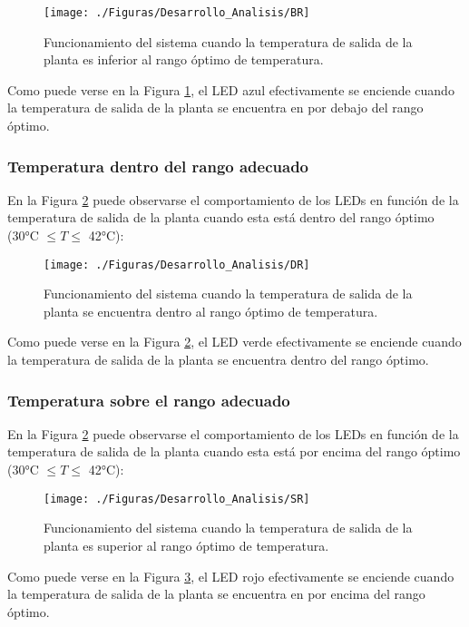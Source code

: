 \begin{figure}[H]
\centering
\texttt{[image: ./Figuras/Desarrollo\_Analisis/BR]}
\caption{Funcionamiento del sistema cuando la temperatura de salida de la planta es inferior al rango óptimo de temperatura.} 
\label{fig:BR}
\end{figure}

Como puede verse en la Figura \ref{fig:BR}, el LED azul efectivamente se enciende cuando la temperatura de salida de la planta se encuentra en por debajo del rango óptimo.

\subsubsection{Temperatura dentro del rango adecuado}
En la Figura \ref{fig:DR} puede observarse el comportamiento de los LEDs en función de la temperatura de salida de la planta cuando esta está dentro del rango óptimo (30°C $\leq T \leq$ 42°C):

\begin{figure}[H]
\centering
\texttt{[image: ./Figuras/Desarrollo\_Analisis/DR]}
\caption{Funcionamiento del sistema cuando la temperatura de salida de la planta se encuentra dentro al rango óptimo de temperatura.} 
\label{fig:DR}
\end{figure}

Como puede verse en la Figura \ref{fig:DR}, el LED verde efectivamente se enciende cuando la temperatura de salida de la planta se encuentra dentro del rango óptimo.

\subsubsection{Temperatura sobre el rango adecuado}
En la Figura \ref{fig:DR} puede observarse el comportamiento de los LEDs en función de la temperatura de salida de la planta cuando esta está por encima del rango óptimo (30°C $\leq T \leq$ 42°C):

\begin{figure}[H]
\centering
\texttt{[image: ./Figuras/Desarrollo\_Analisis/SR]}
\caption{Funcionamiento del sistema cuando la temperatura de salida de la planta es superior al rango óptimo de temperatura.} 
\label{fig:SR}
\end{figure}

Como puede verse en la Figura \ref{fig:SR}, el LED rojo efectivamente se enciende cuando la temperatura de salida de la planta se encuentra en por encima del rango óptimo.

